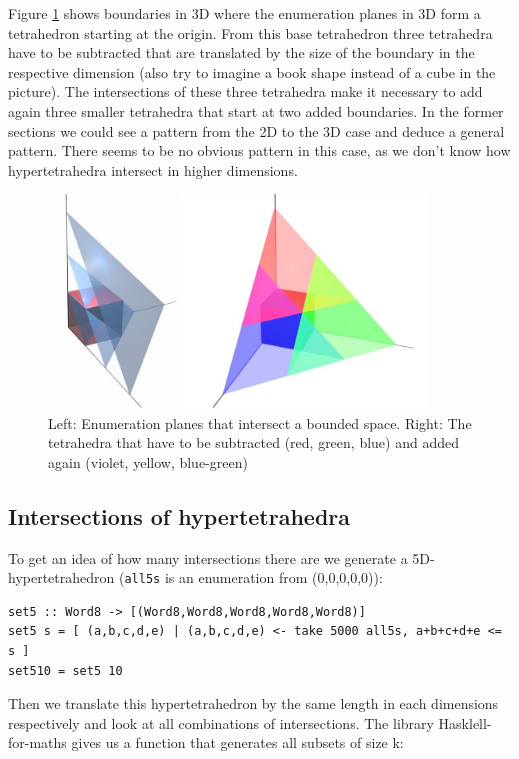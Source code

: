 \documentclass{tmr}
\begin{document}
Figure \ref{enum3bounded} shows boundaries in 3D where the enumeration planes in 3D form a tetrahedron starting at the origin. From this base tetrahedron three tetrahedra have to be subtracted that are translated by the size of the boundary in the respective dimension (also try to imagine a book shape instead of a cube in the picture). The intersections of these three tetrahedra make it necessary to add again three smaller tetrahedra that start at two added boundaries. In the former sections we could see a pattern from the 2D to the 3D case and deduce a general pattern. There seems to be no obvious pattern in this case, as we don't know how hypertetrahedra intersect in higher dimensions.

\begin{figure}[htbp]
  \centering
    \includegraphics[width=0.9\textwidth]{planes.jpg}
    \caption{Left: Enumeration planes that intersect a bounded space. Right: The tetrahedra that have to be subtracted (red, green, blue) and added again (violet, yellow, blue-green) }
  \label{enum3bounded}
\end{figure}

\subsection{Intersections of hypertetrahedra}
To get an idea of how many intersections there are we generate a 5D-hypertetrahedron (\verb|all5s| is an enumeration from (0,0,0,0,0)):

\begin{Verbatim}
set5 :: Word8 -> [(Word8,Word8,Word8,Word8,Word8)]
set5 s = [ (a,b,c,d,e) | (a,b,c,d,e) <- take 5000 all5s, a+b+c+d+e <= s ]
set510 = set5 10
\end{Verbatim}

Then we translate this hypertetrahedron by the same length in each dimensions respectively and look at all combinations of intersections.
The library Hasklell-for-maths gives us a function that generates all subsets of size k:
\end{document}
